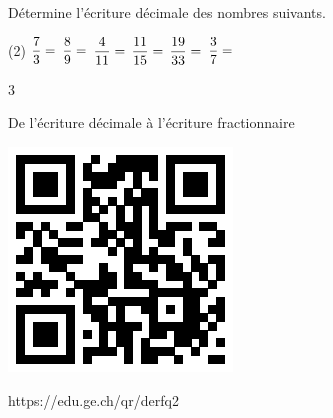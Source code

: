 \documentclass[a4paper,11pt]{report}
\begin{document}
\begin{exop}{
Détermine l'écriture décimale des nombres suivants.
\begin{tasks}(2)
    \task $\dfrac{7}{3}=\hrulefill$\hspace{0.5cm}
    \task $\dfrac{8}{9}=\hrulefill$
    \task $\dfrac{4}{11}=\hrulefill$\hspace{0.5cm}
    \task $\dfrac{11}{15}=\hrulefill$
    \task $\dfrac{19}{33}=\hrulefill$\hspace{0.5cm}
    \task $\dfrac{3}{7}=\hrulefill$
\end{tasks}
 \vspace{1pt}

}{3}\end{exop}


\begin{qmun}{De l'écriture décimale à l'écriture fractionnaire}{
		\begin{center}
\includegraphics[scale=1]{media/qr/derfq2}

\tiny{{https://edu.ge.ch/qr/derfq2}}
		\end{center}
	}
\end{qmun}

\end{document}
